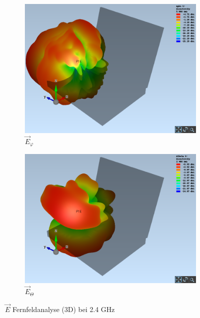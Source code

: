 \begin{figure}[h!]
	\begin{subfigure}[b]{0.48\textwidth}
		\includegraphics[width=1\textwidth]{../fig/plt/crazy_stuff_l4_pcb_v2c_laptop_1a_105_2ghz4_3d_farfield_ephi_xyz.png}
		\caption{$\vec{E}_{\varphi}$}
	\end{subfigure}
	\begin{subfigure}[b]{0.48\textwidth}
		\includegraphics[width=1\textwidth]{../fig/plt/crazy_stuff_l4_pcb_v2c_laptop_1a_105_2ghz4_3d_farfield_etheta_xyz.png}
		\caption{$\vec{E}_{\Theta}$}
	\end{subfigure}
	\caption{$\vec{E}$ Fernfeldanalyse (3D) bei 2.4 GHz}
\end{figure}


\clearpage
